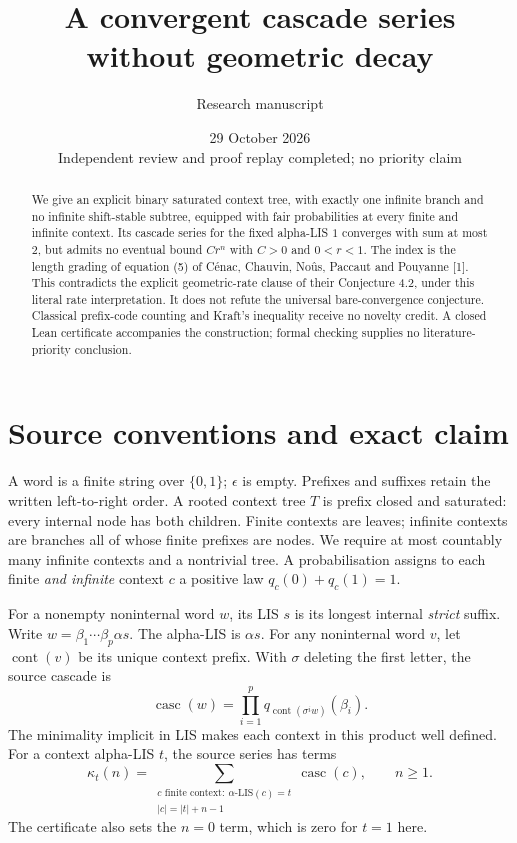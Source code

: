 \documentclass[11pt]{article}
\title{A convergent cascade series without geometric decay}
\author{Research manuscript}
\date{29 October 2026\\Independent review and proof replay completed; no priority claim}
\newcommand{\kap}{\kappa}
\begin{document}
\maketitle
\begin{abstract}
We give an explicit binary saturated context tree, with exactly one infinite
branch and no infinite shift-stable subtree, equipped with fair probabilities
at every finite and infinite context. Its cascade series for the fixed
alpha-LIS $1$ converges with sum at most $2$, but admits no eventual bound
$Cr^n$ with $C>0$ and $0<r<1$. The index is the length grading of equation (5)
of C\'enac, Chauvin, No\^us, Paccaut and Pouyanne [1]. This contradicts the
explicit geometric-rate clause of their Conjecture 4.2, under this literal
rate interpretation. It does not refute the universal bare-convergence
conjecture. Classical prefix-code counting and Kraft's inequality receive no
novelty credit. A closed Lean certificate accompanies the construction;
formal checking supplies no literature-priority conclusion.
\end{abstract}
\section{Source conventions and exact claim}
A word is a finite string over $\{0,1\}$; $\epsilon$ is empty. Prefixes and
suffixes retain the written left-to-right order. A rooted context tree $T$
is prefix closed and saturated: every internal node has both children.
Finite contexts are leaves; infinite contexts are branches all of whose
finite prefixes are nodes. We require at most countably many infinite
contexts and a nontrivial tree. A probabilisation assigns to each finite
\emph{and infinite} context $c$ a positive law $q_c(0)+q_c(1)=1$.

For a nonempty noninternal word $w$, its LIS $s$ is its longest internal
\emph{strict} suffix. Write $w=\beta_1\cdots\beta_p\alpha s$.
The alpha-LIS is $\alpha s$. For any noninternal word $v$, let
$\operatorname{cont}(v)$ be its unique context prefix. With $\sigma$ deleting
the first letter, the source cascade is
\[
 \operatorname{casc}(w)=\prod_{i=1}^p
 q_{\operatorname{cont}(\sigma^i w)}(\beta_i).
\]
The minimality implicit in LIS makes each context in this product well defined.
For a context alpha-LIS $t$, the source series has terms
\[
 \kap_t(n)=\sum_{\substack{c\text{ finite context}:\ \alpha\text{-LIS}(c)=t\\
 |c|=|t|+n-1}}\operatorname{casc}(c),\qquad n\geq1.
\]
The certificate also sets the $n=0$ term, which is zero for $t=1$ here.
\newpage
\end{document}
